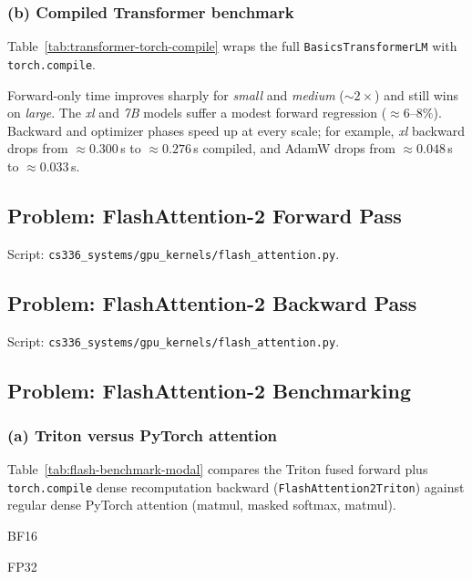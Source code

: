 \documentclass[11pt]{article}
\newcommand{\question}[1]{\subsection*{#1}}
\newcommand{\subquestion}[1]{\subsubsection*{#1}}
\begin{document}
\begin{table}[H]
  \centering
  \resizebox{\textwidth}{!}{}
  \caption{Dense attention: vanilla versus \texttt{torch.compile} mean forward/backward time per timed iteration (ms).}
  \label{tab:attention-torch-compile}
\end{table}

\subquestion{(b) Compiled Transformer benchmark}
Table~\ref{tab:transformer-torch-compile} wraps the full \texttt{BasicsTransformerLM} with \texttt{torch.compile}.

\begin{table}[H]
  \centering
  
  \caption{End-to-end Transformer: mean seconds per step for vanilla versus \texttt{torch.compile}. Backward column is mean$(\mathrm{fb})-\mathrm{mean}(\mathrm{f})$; optimizer column is mean$(\mathrm{fbo})-\mathrm{mean}(\mathrm{fb})$.}
  \label{tab:transformer-torch-compile}
\end{table}

Forward-only time improves sharply for \emph{small} and \emph{medium} ($\sim2\times$) and still wins on \emph{large}. The \emph{xl} and \emph{7B} models suffer a modest forward regression ($\approx6$--$8\%$). Backward and optimizer phases speed up at every scale; for example, \emph{xl} backward drops from $\approx0.300$\,s to $\approx0.276$\,s compiled, and AdamW drops from $\approx0.048$\,s to $\approx0.033$\,s.

\question{Problem: FlashAttention-2 Forward Pass}
Script: \texttt{cs336\_systems/gpu\_kernels/flash\_attention.py}.

\question{Problem: FlashAttention-2 Backward Pass}
Script: \texttt{cs336\_systems/gpu\_kernels/flash\_attention.py}.

\question{Problem: FlashAttention-2 Benchmarking}
\subquestion{(a) Triton versus PyTorch attention}
Table~\ref{tab:flash-benchmark-modal} compares the Triton fused forward plus \texttt{torch.compile} dense recomputation backward (\texttt{FlashAttention2Triton}) against regular dense PyTorch attention (matmul, masked softmax, matmul).

\begin{table}[H]
  \centering
  \footnotesize
  BF16\par\vspace{0.5em}
  \resizebox{\textwidth}{!}{}
  \medskip
  FP32\par\vspace{0.5em}
  \resizebox{\textwidth}{!}{}
  \caption{FlashAttention-2 (student Triton forward + compiled backward) versus dense PyTorch attention: median latency (ms). \emph{Py}~= dense baseline; \emph{Tr}~= \texttt{FlashAttention2Triton}. Upper block: BF16; lower block: FP32.}
  \label{tab:flash-benchmark-modal}
\end{table}
\end{document}

